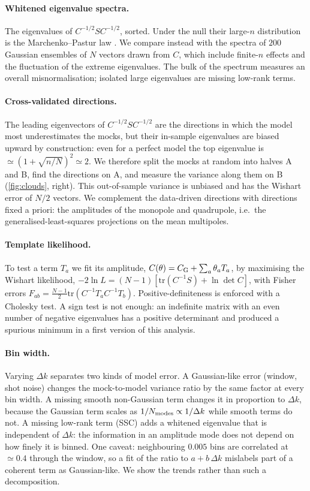 \paragraph{Whitened eigenvalue spectra.} The eigenvalues of $C^{-1/2}SC^{-1/2}$, sorted. Under the null their large-$n$ distribution is the Marchenko--Pastur law \cite{MarchenkoPastur1967}. We compare instead with the spectra of $200$ Gaussian ensembles of $N$ vectors drawn from $C$, which include finite-$n$ effects and the fluctuation of the extreme eigenvalues. The bulk of the spectrum measures an overall misnormalisation; isolated large eigenvalues are missing low-rank terms.

\paragraph{Cross-validated directions.} The leading eigenvectors of $C^{-1/2}SC^{-1/2}$ are the directions in which the model most underestimates the mocks, but their in-sample eigenvalues are biased upward by construction: even for a perfect model the top eigenvalue is $\simeq(1+\sqrt{n/N})^2\simeq2$. We therefore split the mocks at random into halves A and B, find the directions on A, and measure the variance along them on B (\cref{fig:clouds}, right). This out-of-sample variance is unbiased and has the Wishart error of $N/2$ vectors. We complement the data-driven directions with directions fixed a priori: the amplitudes of the monopole and quadrupole, i.e.\ the generalised-least-squares projections on the mean multipoles.

\paragraph{Template likelihood.} To test a term $T_a$ we fit its amplitude, $C(\theta)=C_{\rm G}+\sum_a\theta_aT_a$, by maximising the Wishart likelihood, $-2\ln L=(N-1)[\mathrm{tr}(C^{-1}S)+\ln\det C]$, with Fisher errors $F_{ab}=\frac{N-1}{2}\mathrm{tr}(C^{-1}T_aC^{-1}T_b)$. Positive-definiteness is enforced with a Cholesky test. A sign test is not enough: an indefinite matrix with an even number of negative eigenvalues has a positive determinant and produced a spurious minimum in a first version of this analysis.

\paragraph{Bin width.} Varying $\Delta k$ separates two kinds of model error. A Gaussian-like error (window, shot noise) changes the mock-to-model variance ratio by the same factor at every bin width. A missing smooth non-Gaussian term changes it in proportion to $\Delta k$, because the Gaussian term scales as $1/N_{\rm modes}\propto1/\Delta k$ while smooth terms do not. A missing low-rank term (SSC) adds a whitened eigenvalue that is independent of $\Delta k$: the information in an amplitude mode does not depend on how finely it is binned. One caveat: neighbouring $0.005$ bins are correlated at $\simeq0.4$ through the window, so a fit of the ratio to $a+b\,\Delta k$ mislabels part of a coherent term as Gaussian-like. We show the trends rather than such a decomposition.

